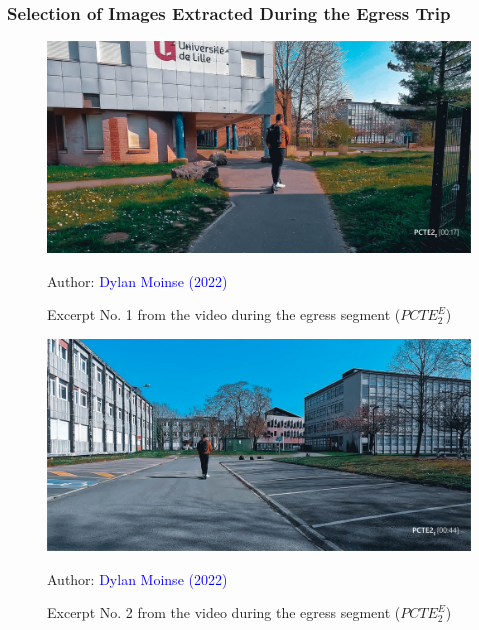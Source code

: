 \subsubsection{Selection of Images Extracted During the Egress Trip}

    \begin{figure}[h!]\vspace*{4pt}
        \caption*{Excerpt No. 1 from the video during the egress segment (\(PCTE^{E}_{2}\))}
        \centerline{\includegraphics[width=0.75\columnwidth]{src/Figures/Annexes/Extrait_Video_PCTE2_Egress_1.jpg}}
        \vspace{5pt}
        \begin{flushright}\scriptsize{
        Author: \textcolor{blue}{Dylan Moinse (2022)}
        }\end{flushright}
    \end{figure}

    \begin{figure}[h!]\vspace*{4pt}
        \caption*{Excerpt No. 2 from the video during the egress segment (\(PCTE^{E}_{2}\))}
        \centerline{\includegraphics[width=0.75\columnwidth]{src/Figures/Annexes/Extrait_Video_PCTE2_Egress_2.jpg}}
        \vspace{5pt}
        \begin{flushright}\scriptsize{
        Author: \textcolor{blue}{Dylan Moinse (2022)}
        }\end{flushright}
    \end{figure}

